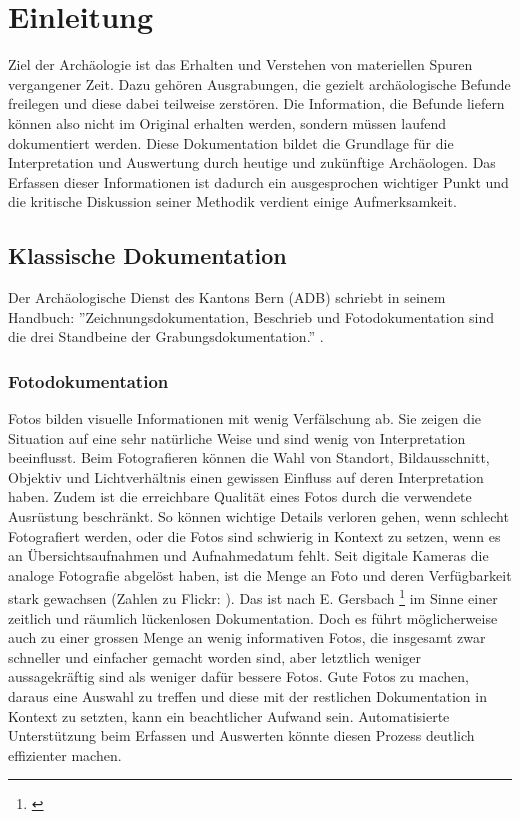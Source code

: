 \chapter{Einleitung}
	Ziel der Archäologie ist das Erhalten und Verstehen von materiellen Spuren vergangener Zeit. Dazu gehören Ausgrabungen, die gezielt archäologische Befunde freilegen und diese dabei teilweise zerstören. Die Information, die Befunde liefern können also nicht im Original erhalten werden, sondern müssen laufend dokumentiert werden. Diese Dokumentation bildet die Grundlage für die Interpretation und Auswertung durch heutige und zukünftige Archäologen.
	Das Erfassen dieser Informationen ist dadurch ein ausgesprochen wichtiger Punkt und die kritische Diskussion seiner Methodik verdient einige Aufmerksamkeit.
	
	\section{Klassische Dokumentation}
		Der Archäologische Dienst des Kantons Bern (ADB) schriebt in seinem Handbuch: ''Zeichnungsdokumentation, Beschrieb und Fotodokumentation sind die drei Standbeine der Grabungsdokumentation.'' \cite{adb:handbuch}.
		
		\subsection{Fotodokumentation}
			Fotos bilden visuelle Informationen mit wenig Verfälschung ab. Sie zeigen die Situation auf eine sehr natürliche Weise und sind wenig von Interpretation beeinflusst.
			Beim Fotografieren können die Wahl von Standort, Bildausschnitt, Objektiv und Lichtverhältnis einen gewissen Einfluss auf deren Interpretation haben. Zudem ist die erreichbare Qualität eines Fotos durch die verwendete Ausrüstung beschränkt.
			So können wichtige Details verloren gehen, wenn schlecht Fotografiert werden, oder die Fotos sind schwierig in Kontext zu setzen, wenn es an Übersichtsaufnahmen und Aufnahmedatum fehlt.
			Seit digitale Kameras die analoge Fotografie abgelöst haben, ist die Menge an Foto und deren Verfügbarkeit stark gewachsen (Zahlen zu Flickr: \cite{flickr:number}). Das ist nach E. Gersbach \footnote{\cite{ausgrabung_heute}} im Sinne einer zeitlich und räumlich lückenlosen Dokumentation.
			Doch es führt möglicherweise auch zu einer grossen Menge an wenig informativen Fotos, die insgesamt zwar schneller und einfacher gemacht worden sind, aber letztlich weniger aussagekräftig sind als weniger dafür bessere Fotos.
			Gute Fotos zu machen, daraus eine Auswahl zu treffen und diese mit der restlichen Dokumentation in Kontext zu setzten, kann ein beachtlicher Aufwand sein.
			Automatisierte Unterstützung beim Erfassen und Auswerten könnte diesen Prozess deutlich effizienter machen.

